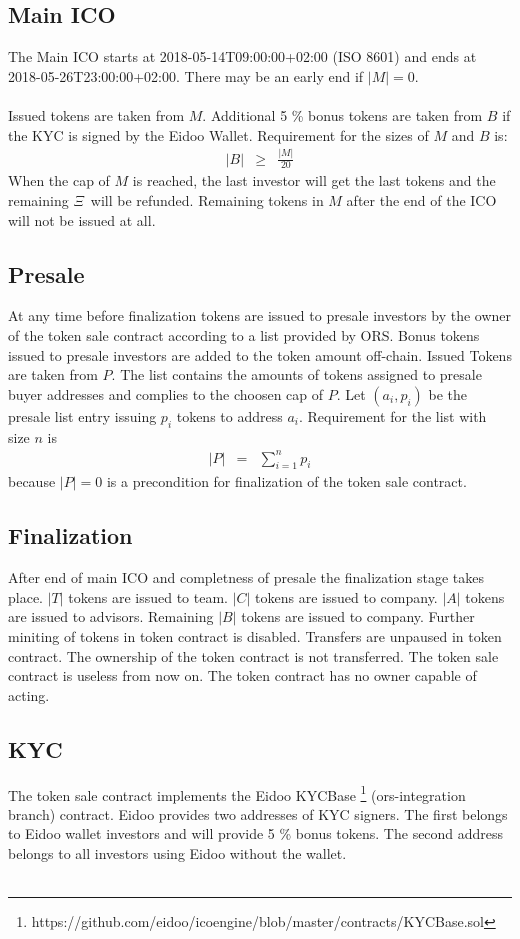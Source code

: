 \documentclass{article}
\newcommand{\ether}{$\Xi$}
\begin{document}
\subsection{Main ICO}
The Main ICO starts at 2018-05-14T09:00:00+02:00 (ISO 8601) and ends at\\
2018-05-26T23:00:00+02:00. There may be an early end if $|M| = 0$.
\\\\ Issued tokens are taken from $M$. Additional 5 \% bonus tokens are taken
from $B$ if the KYC is signed by the Eidoo Wallet. Requirement for the sizes of
$M$ and $B$ is:
\begin{eqnarray}
  |B| & \geq & \frac{|M|}{20} 
  \end{eqnarray}
When the cap of $M$ is
reached, the last investor will get the last tokens and the remaining \ether \
will be refunded.
Remaining tokens in $M$ after the end of the ICO will not be issued at all.
\subsection{Presale}
At any time before finalization tokens are issued to
presale investors by the owner of the token sale contract according to a list
provided by ORS. Bonus tokens issued to presale investors are added to the token
amount off-chain. Issued Tokens are taken from $P$.
The list contains the amounts of tokens
assigned to presale buyer addresses and complies to the choosen cap of
$P$. Let $(a_i,p_i)$ be the presale list entry issuing $p_i$ tokens to address $a_i$.
Requirement for the list with size $n$
is
\begin{eqnarray}
     |P| & = & \sum_{i=1}^n  p_i 
  \end{eqnarray}
because $|P| = 0$ is a precondition for finalization of the token sale contract.


\subsection{Finalization}
After end of main ICO and completness of  presale the
finalization stage takes place. $|T|$ tokens are issued to team. $|C|$ tokens are issued to company.
$|A|$ tokens are issued to advisors. Remaining $|B|$ tokens are issued to
company. Further miniting of tokens in token contract is disabled. Transfers
are unpaused in token contract. The ownership of the token contract is not
transferred. The token sale contract is useless from now on. The token contract
has no owner capable of acting.
\subsection{KYC}
The token sale contract implements the Eidoo KYCBase
\footnote{https://github.com/eidoo/icoengine/blob/master/contracts/KYCBase.sol}
(ors-integration branch) contract. Eidoo provides two addresses of KYC signers.
The first belongs to Eidoo wallet investors and will provide 5 \% bonus tokens. The second address belongs to all investors using Eidoo without the wallet. \\\\
\end{document}
